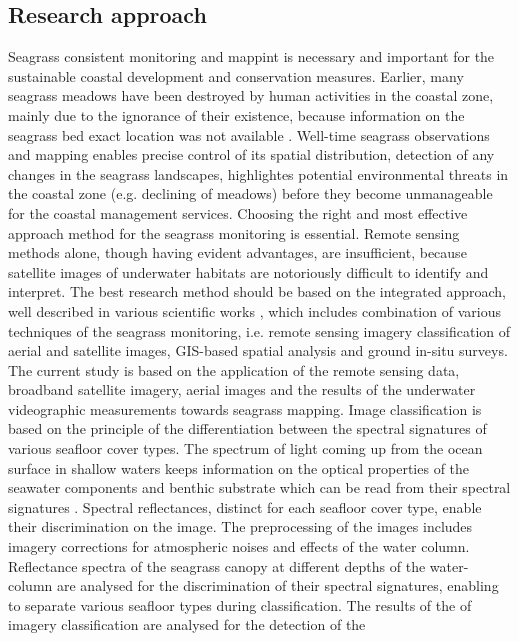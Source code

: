 \documentclass[10pt, a4paper]{article}
\begin{document}
\subsection{Research approach}
Seagrass consistent monitoring and mappint is necessary and important for the sustainable coastal
development and conservation measures. Earlier, many seagrass meadows have been destroyed by
human activities in the coastal zone, mainly due to the ignorance of their existence, because
information on the seagrass bed exact location was not available \cite{Choo06}\label{Choo06}. Well-time seagrass
observations and mapping enables precise control of its spatial distribution, detection of any changes
in the seagrass landscapes, highlightes potential environmental threats in the coastal zone (e.g.
declining of meadows) before they become unmanageable for the coastal management services.
Choosing the right and most effective approach method for the seagrass monitoring is essential.
Remote sensing methods alone, though having evident advantages, are insufficient, because satellite
images of underwater habitats are notoriously difficult to identify and interpret. The best research
method should be based on the integrated approach, well described in various scientific works \cite{Brown02,Montefalcone06,Kirkman96}\label{Brown02} \label{Montefalcone06} \label{Kirkman96}, which includes combination of various
techniques of the seagrass monitoring, i.e. remote sensing imagery classification of aerial and satellite
images, GIS-based spatial analysis and ground in-situ surveys.
The current study is based on the application of the remote sensing data, broadband satellite imagery,
aerial images and the results of the underwater videographic measurements towards seagrass
mapping. Image classification is based on the principle of the differentiation between the spectral
signatures of various seafloor cover types. The spectrum of light coming up from the ocean surface in
shallow waters keeps information on the optical properties of the seawater components and benthic
substrate which can be read from their spectral signatures \cite{Werdell03}\label{Werdell03}. Spectral
reflectances, distinct for each seafloor cover type, enable their discrimination on the image. The preprocessing
of the images includes imagery corrections for atmospheric noises and effects of the water
column. Reflectance spectra of the seagrass canopy at different depths of the water-column are
analysed for the discrimination of their spectral signatures, enabling to separate various seafloor types
during classification. The results of the of imagery classification are analysed for the detection of the
\end{document}
